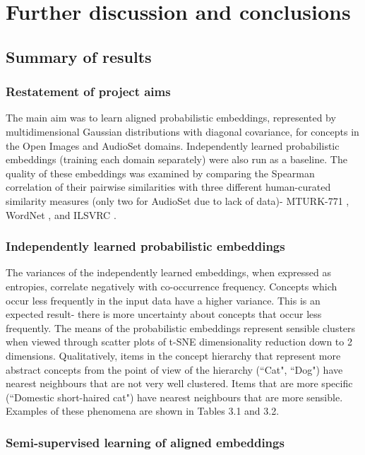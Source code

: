\chapter{Further discussion and conclusions}

\section{Summary of results}

\subsection{Restatement of project aims}

The main aim was to learn aligned probabilistic embeddings, represented by multidimensional Gaussian distributions with diagonal covariance, for concepts in the Open Images and AudioSet domains. Independently learned probabilistic embeddings (training each domain separately) were also run as a baseline. The quality of these embeddings was examined by comparing the Spearman correlation of their pairwise similarities with three different human-curated similarity measures (only two for AudioSet due to lack of data)- MTURK-771 \cite{mturk771}, WordNet \cite{WordNet}, and ILSVRC \cite{RoadsLoveCVPR}. 

\subsection{Independently learned probabilistic embeddings}

The variances of the independently learned embeddings,  when expressed as entropies, correlate negatively with co-occurrence frequency. Concepts which occur less frequently in the input data have a higher variance. This is an expected result- there is more uncertainty about concepts that occur less frequently. The means of the probabilistic embeddings represent sensible clusters when viewed through scatter plots of t-SNE dimensionality reduction down to 2 dimensions. Qualitatively, items in the concept hierarchy that represent more abstract concepts from the point of view of the hierarchy (``Cat", ``Dog") have nearest neighbours that are not very well clustered. Items that are more specific (``Domestic short-haired cat")  have nearest neighbours that are more sensible. Examples of these phenomena are shown in Tables 3.1 and 3.2. %

\subsection{Semi-supervised learning of aligned embeddings}

